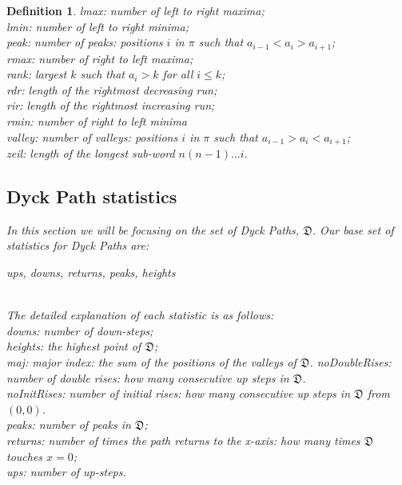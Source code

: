 \documentclass[12pt]{article}
\newtheorem{definition}{Definition}
\newcommand{\DyckP}{\mathfrak{D}}
\begin{document}
\begin{definition}
lmax: number of left to right maxima;\\
lmin: number of left to right minima;\\
peak: number of peaks: positions $i$ in $\pi$ such that $a_{i-1} < a_i > a_{i+1}$;\\
rmax: number of right to left maxima;\\
rank: largest $k$ such that $a_i > k$ for all $i \leq k$;\\
rdr: length of the rightmost decreasing run;\\
rir: length of the rightmost increasing run;\\
rmin: number of right to left minima\\
valley: number of valleys: positions $i$ in $\pi$ such that $a_{i-1} > a_i < a_{i+1}$;\\
zeil: length of the longest sub-word $n(n-1)...i$.\\

\subsection{Dyck Path statistics}
In this section we will be focusing on the set of Dyck Paths, $\DyckP$. Our base set of statistics for Dyck Paths are:\\ \centerline{ups, downs, returns, peaks, heights}\\
The detailed explanation of each statistic is as follows:\\
downs: number of down-steps;\\
heights: the highest point of $\DyckP$;\\
maj: major index: the sum of the positions of the valleys of $\DyckP$.
noDoubleRises: number of double rises: how many consecutive up steps in $\DyckP$.\\
noInitRises: number of initial rises: how many consecutive up steps in $\DyckP$ from $(0,0)$.\\
peaks: number of peaks in $\DyckP$;\\
returns: number of times the path returns to the x-axis: how many times $\DyckP$ touches $x=0$;\\
ups: number of up-steps.\\


\end{definition}
\end{document}
